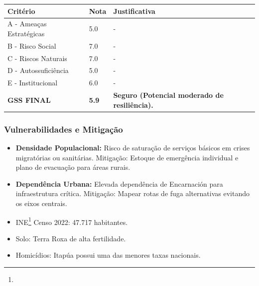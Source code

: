 \begin{table}[ht!]
\small \begin{tabular}{p{3.0cm}p{0.8cm}p{6.0cm}} \toprule
\textbf{Critério} & \textbf{Nota} & \textbf{Justificativa} \\ \midrule
A - Ameaças Estratégicas & 5.0 & - \\
B - Risco Social & 7.0 & - \\
C - Riscos Naturais & 7.0 & - \\
D - Autossuficiência & 5.0 & - \\
E - Institucional & 6.0 & - \\
\midrule \textbf{GSS FINAL} & \textbf{5.9} & \textbf{Seguro (Potencial moderado de resiliência).} \\ \bottomrule \end{tabular}
\end{table}
\subsubsection{Vulnerabilidades e
Mitigação}

\begin{itemize}
\item
  \textbf{Densidade Populacional:} Risco de saturação de serviços
  básicos em crises migratórias ou sanitárias. Mitigação: Estoque de
  emergência individual e plano de evacuação para áreas rurais.
\item
  \textbf{Dependência Urbana:} Elevada dependência de Encarnación para
  infraestrutura crítica. Mitigação: Mapear rotas de fuga alternativas
  evitando os eixos centrais.
\item
  INE\footnote{\fineINE} Censo 2022: 47.717 habitantes.
\item
  Solo: Terra Roxa de alta fertilidade.
\item
  Homicídios: Itapúa possui uma das menores taxas nacionais.
\end{itemize}
